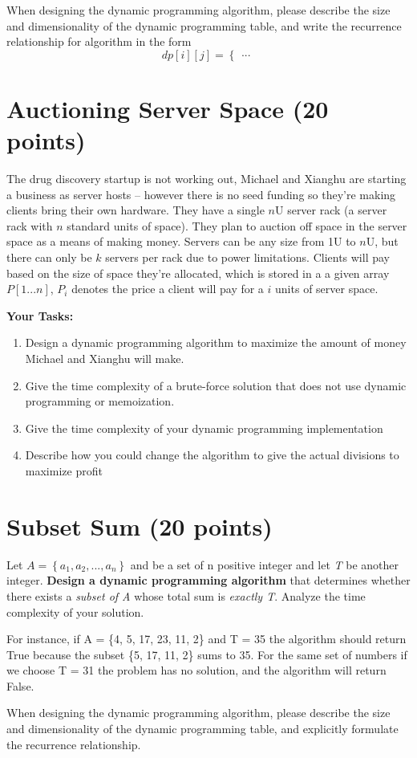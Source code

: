\documentclass{article}[12pt]
\begin{document}
When designing the dynamic programming algorithm, please describe the size and dimensionality of the dynamic programming table, and write the recurrence relationship for algorithm in the form
    \[
    dp[i][j] = \begin{cases}
        ...
    \end{cases}
    \]

\newpage
\section{Auctioning Server Space (20 points)}

The drug discovery startup is not working out, Michael and Xianghu are starting a business as server hosts -- however there is no seed funding so they're making clients bring their own hardware. They have a single $n$U server rack (a server rack with $n$ standard units of space). They plan to auction off space in the server space as a means of making money. Servers can be any size from 1U to $n$U, but there can only be $k$ servers per rack due to power limitations. Clients will pay based on the size of space they're allocated, which is stored in a a given array $P[1...n]$, $P_i$ denotes the price a client will pay for a $i$ units of server space.

\noindent\textbf{Your Tasks:}
\begin{enumerate}
    \item Design a dynamic programming algorithm to maximize the amount of money Michael and Xianghu will make.
    \item Give the time complexity of a brute-force solution that does not use dynamic programming or memoization.
    \item Give the time complexity of your dynamic programming implementation
    \item Describe how you could change the algorithm to give the actual divisions to maximize profit
\end{enumerate}


\section{Subset Sum (20 points)  }
Let $A = \left\{a_1 , a_2 ,. . . , a_n \right\}$ and be a set of n positive integer and let \textit{T} be another integer. \textbf{Design a dynamic programming algorithm} that determines whether there exists a \textit{subset of A} whose total sum is \textit{exactly T}. Analyze the time complexity
of your solution.

For instance, if A = \{4, 5, 17, 23, 11, 2\} and T = 35 the algorithm should return True because the subset \{5, 17, 11, 2\} sums to 35. For the same set of numbers if we choose T = 31 the problem has no solution, and the algorithm will return False.

When designing the dynamic programming algorithm, please describe the size and dimensionality of the dynamic programming table, and explicitly formulate the recurrence relationship. 
\end{document}
